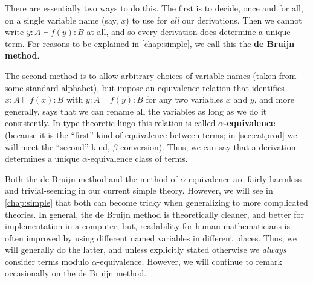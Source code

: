 \documentclass{book}
\let\types\vdash
\begin{document}
There are essentially two ways to do this.
The first is to decide, once and for all, on a single variable name (say, $x$) to use for \emph{all} our derivations.
Then we cannot write $y:A \types f(y):B$ at all, and so every derivation does determine a unique term.
For reasons to be explained in \cref{chap:simple},
we call this the \textbf{de Bruijn method}. %

\label{sec:alpha}%
The second method is to allow arbitrary choices of variable names (taken from some standard alphabet), but impose an equivalence relation that identifies $x:A \types f(x):B$ with $y:A \types f(y):B$ for any two variables $x$ and $y$, and
more generally, says that we can rename all the variables as long as we do it consistently.
In type-theoretic lingo this relation is called \textbf{$\alpha$-equivalence} (because it is the ``first'' kind of equivalence between terms; in \cref{sec:catprod} we will meet the ``second'' kind, $\beta$-conversion).
Thus, we can say that a derivation determines a unique $\alpha$-equivalence class of terms.

Both the de Bruijn method and the method of $\alpha$-equivalence are fairly harmless and trivial-seeming in our current simple theory.
However, we will see in \cref{chap:simple} that both can become tricky when generalizing to more complicated theories.
In general, the de Bruijn method is theoretically cleaner, and better for implementation in a computer; but, readability for human mathematicians is often improved by using different named variables in different places.
Thus, we will generally do the latter, and unless explicitly stated otherwise we \emph{always} consider terms modulo $\alpha$-equivalence.
However, we will continue to remark occasionally on the de Bruijn method.
\end{document}
